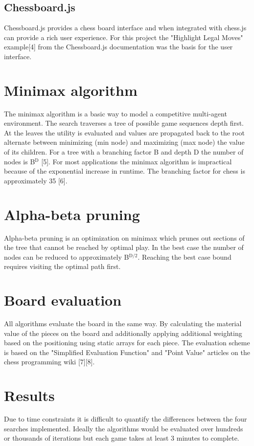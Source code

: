 \documentclass[11pt]{article}
\begin{document}
\subsection*{Chessboard.js}
\label{sec:orgc2b6cd3}
Chessboard.js provides a chess board interface and when integrated with chess.js can provide a rich user experience. For this project the "Highlight Legal Moves" example[4] from the Chessboard.js documentation was the basis for the user interface.

\section*{Minimax algorithm}
\label{sec:orgab44a39}
The minimax algorithm is a basic way to model a competitive multi-agent environment. The search traverses a tree of possible game sequences depth first. At the leaves the utility is evaluated and values are propagated back to the root alternate between minimizing (min node) and maximizing (max node) the value of its children. For a tree with a branching factor B and depth D the number of nodes is B\(^{\text{D}}\) [5]. For most applications the minimax algorithm is impractical because of the exponential increase in runtime. The branching factor for chess is approximately 35 [6].

\section*{Alpha-beta pruning}
\label{sec:orgc9a8d94}
Alpha-beta pruning is an optimization on minimax which prunes out sections of the tree that cannot be reached by optimal play. In the best case the number of nodes can be reduced to approximately B\(^{\text{D/2}}\). Reaching the best case bound requires visiting the optimal path first.

\section*{Board evaluation}
\label{sec:org902e1ab}
All algorithms evaluate the board in the same way. By calculating the material value of the pieces on the board and additionally applying additional weighting based on the positioning using static arrays for each piece. The evaluation scheme is based on the "Simplified Evaluation Function" and "Point Value" articles on the chess programming wiki [7][8]. 

\section*{Results}
\label{sec:orgfb365cd}
Due to time constraints it is difficult to quantify the differences between the four searches implemented. Ideally the algorithms would be evaluated over hundreds or thousands of iterations but each game takes at least 3 minutes to complete.
\end{document}
